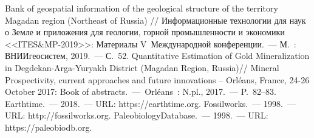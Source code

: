 \begin{thebibliography}{99}
\bibitem{} Bank of geospatial information of the geological structure of the territory Magadan region (Northeast of Russia) // Информационные технологии для наук о Земле и приложения для геологии, горной промышленности и экономики <<ITES\&MP-2019>>: Материалы V~Международной конференции.~--- М.~: ВНИИгеосистем, 2019.~--- С.~52.
\bibitem{} Quantitative Estimation of Gold Mineralization in Degdekan-Arga-Yuryakh District (Magadan Region, Russia)// Mineral Prospectivity, current approaches and future innovations -- Orléans, France, 24-26 October 2017: Book of abstracts.~--- Orléans~: N.pl., 2017.~--- P.~82--83.
\bibitem{}Earthtime.~--- 2018.~--- URL: https://earthtime.org.
\bibitem{}Fossilworks.~--- 1998.~--- URL: http://fossilworks.org.
\bibitem{}PaleobiologyDatabase.~--- 1998.~--- URL: https://paleobiodb.org.

\end{thebibliography}
